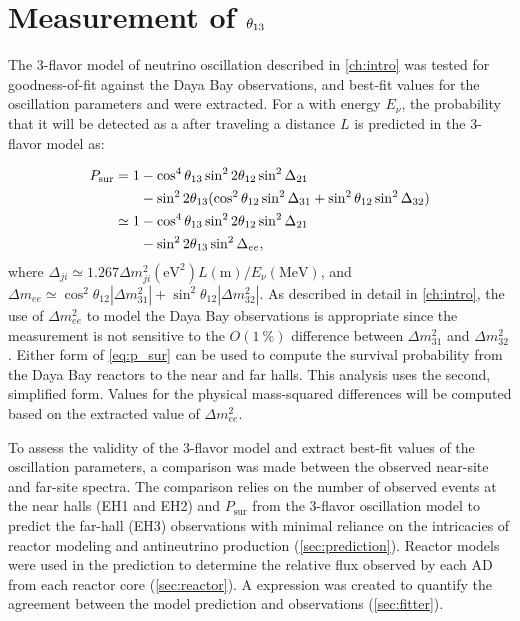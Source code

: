 \chapter{Measurement of \texorpdfstring{$\theta_{13}$}{theta13}}
\label{ch:analysis}

The 3-flavor model of neutrino oscillation described in \cref{ch:intro}
was tested for goodness-of-fit against the Daya Bay observations,
and best-fit values for the oscillation parameters \thetaot{} and \dmee{}
were extracted.
For a \nuebar{} with energy $E_\nu$,
the probability that it will be detected as a \nuebar{}
after traveling a distance $L$ is predicted in the 3-flavor model as:

\begin{align}\label{eq:p_sur}
    \begin{split}
        P_\text{sur} = 1 &- \cos^4\theta_{13}\sin^22\theta_{12}\sin^2\Delta_{21} \\
                         &- \sin^22\theta_{13}(\cos^2\theta_{12}\sin^2\Delta_{31}
                     + \sin^2\theta_{12}\sin^2\Delta_{32}) \\
        \simeq 1 &- \cos^4\theta_{13}\sin^22\theta_{12}\sin^2\Delta_{21} \\
                 &- \sin^22\theta_{13}\sin^2\Delta_{ee},
\end{split}
\end{align}
where
$\Delta_{ji} \simeq 1.267 \Delta m^2_{ji} (\si{\eV}^2) L(\si{\m})/E_\nu (\si{\MeV})$,
and
$\Delta m_{ee} \simeq \cos^2\theta_{12}\left|\Delta m^2_{31}\right| +
\sin^2\theta_{12}\left|\Delta m^2_{32}\right|$.
As described in detail in \cref{ch:intro},
the use of $\Delta m^2_{ee}$ to model the Daya Bay observations
is appropriate since the measurement is not sensitive
to the $O(\SI{1}{\percent})$ difference between $\Delta m^2_{31}$ and $\Delta m^2_{32}$.
Either form of \cref{eq:p_sur} can be used to compute the \nuebar{} survival probability
from the Daya Bay reactors to the near and far halls.
This analysis uses the second, simplified form.
Values for the physical mass-squared differences will be computed
based on the extracted value of $\Delta m^2_{ee}$.

To assess the validity of the 3-flavor model and extract best-fit values
of the oscillation parameters,
a comparison was made between the observed near-site and far-site \nuebar{} spectra.
The comparison relies on the number of observed events at the near halls (EH1 and EH2)
and $P_\text{sur}$ from the 3-flavor oscillation model
to predict the far-hall (EH3) observations
with minimal reliance on the intricacies of reactor modeling
and antineutrino production (\cref{sec:prediction}).
Reactor models were used in the prediction
to determine the relative \nuebar{} flux
observed by each AD from each reactor core (\cref{sec:reactor}).
A \chisquare{} expression was created to quantify the agreement
between the model prediction and observations (\cref{sec:fitter}).


